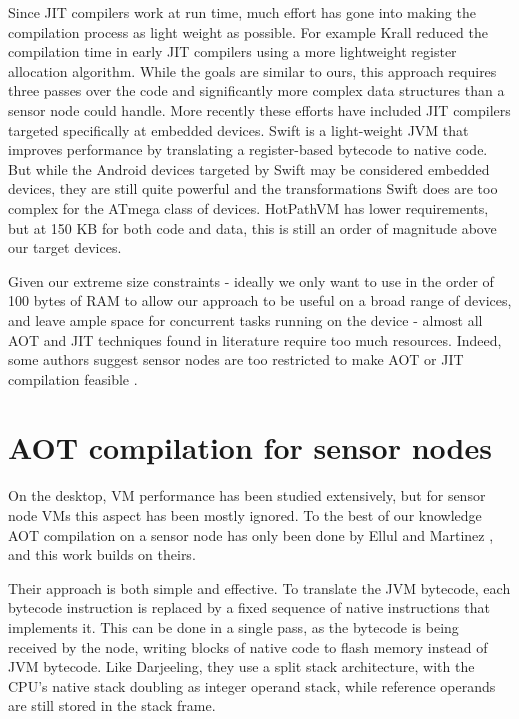 Since JIT compilers work at run time, much effort has gone into making the compilation process as light weight as possible. For example Krall \cite{Krall:1998} reduced the compilation time in early JIT compilers using a more lightweight register allocation algorithm. While the goals are similar to ours, this approach requires three passes over the code and significantly more complex data structures than a sensor node could handle. More recently these efforts have included JIT compilers targeted specifically at embedded devices. Swift \cite{Zhang:2012wf} is a light-weight JVM that improves performance by translating a register-based bytecode to native code. But while the Android devices targeted by Swift may be considered embedded devices, they are still quite powerful and the transformations Swift does are too complex for the ATmega class of devices. HotPathVM \cite{Gal:2006} has lower requirements, but at 150 KB for both code and data, this is still an order of magnitude above our target devices.

Given our extreme size constraints - ideally we only want to use in the order of 100 bytes of RAM to allow our approach to be useful on a broad range of devices, and leave ample space for concurrent tasks running on the device - almost all AOT and JIT techniques found in literature require too much resources. Indeed, some authors suggest sensor nodes are too restricted to make AOT or JIT compilation feasible \cite{Aslam:2011thesis, Wirjawan:2008}.

\section{AOT compilation for sensor nodes}
\label{sec-state-of-the-art-elluls-aot}
On the desktop, VM performance has been studied extensively, but for sensor node VMs this aspect has been mostly ignored. To the best of our knowledge AOT compilation on a sensor node has only been done by Ellul and Martinez \cite{Ellul:2010iw, Ellul:2012thesis}, and this work builds on theirs.

Their approach is both simple and effective. To translate the JVM bytecode, each bytecode instruction is replaced by a fixed sequence of native instructions that implements it. This can be done in a single pass, as the bytecode is being received by the node, writing blocks of native code to flash memory instead of JVM bytecode. Like Darjeeling, they use a split stack architecture, with the CPU's native stack doubling as integer operand stack, while reference operands are still stored in the stack frame.

